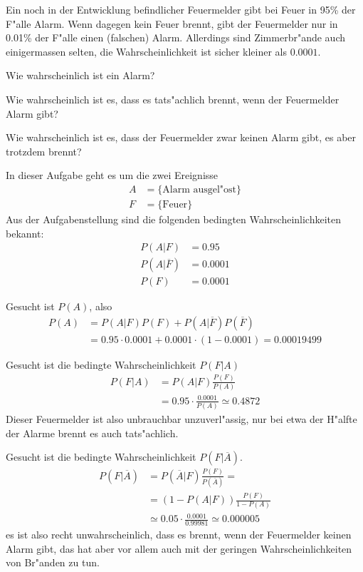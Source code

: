 Ein noch in der Entwicklung befindlicher Feuermelder gibt bei Feuer in 95\%
der F"alle Alarm. Wenn dagegen kein Feuer brennt, gibt der Feuermelder
nur in 0.01\% der F"alle einen (falschen) Alarm. Allerdings sind
Zimmerbr"ande auch einigermassen selten, die Wahrscheinlichkeit
ist sicher kleiner als $0.0001$.

\begin{teilaufgaben}
\item Wie wahrscheinlich ist ein Alarm?
\item Wie wahrscheinlich ist es, dass es tats"achlich brennt, wenn
der Feuermelder Alarm gibt?
\item Wie wahrscheinlich ist es, dass der Feuermelder zwar keinen
Alarm gibt, es aber trotzdem brennt?
\end{teilaufgaben}

\begin{loesung}
In dieser Aufgabe geht es um die zwei Ereignisse
\begin{align*}
A&=\{\text{Alarm ausgel"ost}\}
\\
F&=\{\text{Feuer}\}
\end{align*}
Aus der Aufgabenstellung sind die folgenden bedingten Wahrscheinlichkeiten
bekannt:
\begin{align*}
P(A|F)&=0.95
\\
P(A|\overline F)&=0.0001
\\
P(F)&=0.0001
\end{align*}
\begin{teilaufgaben}
\item Gesucht ist $P(A)$, also
\begin{align*}
P(A)&=P(A|F)P(F)+P(A|\overline F)P(\overline F)
\\
&=0.95\cdot 0.0001+0.0001\cdot(1-0.0001)= 0.00019499
\end{align*}
\item
Gesucht ist die bedingte Wahrscheinlichkeit $P(F|A)$
\begin{align*}
P(F|A)
&=
P(A|F) \frac{P(F)}{P(A)}
\\
&=0.95\cdot\frac{0.0001}{P(A)}\simeq0.4872
\end{align*}
Dieser Feuermelder ist also unbrauchbar unzuverl"assig, nur bei etwa der
H"alfte der Alarme brennt es auch tats"achlich.
\item Gesucht ist die bedingte Wahrscheinlichkeit $P(F|\overline A)$.
\begin{align*}
P(F|\overline A)
&=
P(\overline A|F)\frac{P(F)}{P(\overline A)}=
\\
&=
(1-P(A|F))\frac{P(F)}{1-P(A)}
\\
&\simeq
0.05\cdot \frac{0.0001}{0.99981}
\simeq
0.000005
\end{align*}
es ist also recht unwahrscheinlich, dass es brennt,
wenn der Feuermelder keinen Alarm gibt, das hat aber vor allem auch
mit der geringen Wahrscheinlichkeiten von Br"anden zu tun.
\end{teilaufgaben}
\end{loesung}

